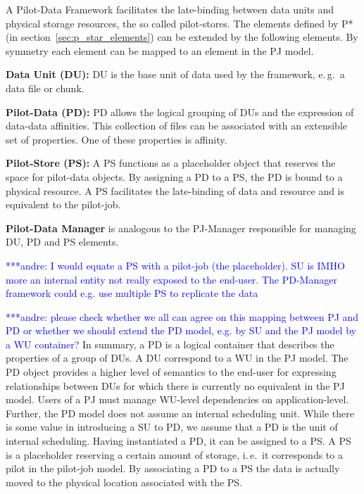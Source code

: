 \documentclass[conference,final]{IEEEtran}
\newcommand{\jhanote}[1]{ {\textcolor{red} { ***shantenu: #1 }}}
\newcommand{\alnote}[1]{ {\textcolor{blue} { ***andre: #1 }}}
\newcommand{\alnote}[1]{}
\newcommand{\jhanote}[1]{}
\begin{document}
A Pilot-Data Framework facilitates the late-binding between data units and
physical storage resources, the so called pilot-stores. The elements defined by
P* (in section~\ref{sec:p_star_elements}) can be extended by the following
elements. By symmetry each element can be mapped to an element in the PJ model.
\begin{compactenum}[A.]
\item \textbf{Data Unit (DU):} DU is the base unit of data used by the framework,
  e.\,g.\ a data file or chunk. 
\item \textbf{Pilot-Data (PD):} PD allows the logical grouping of DUs
  and the expression of data-data affinities. This collection of files
  can be associated with an extensible set of properties. One of these
  properties is affinity. 
\item \textbf{Pilot-Store (PS):} A PS functions as a
	  placeholder object that reserves the space for pilot-data objects. 
	  By assigning a PD to a PS, the PD is bound to a physical resource.
	  A PS facilitates the late-binding of data and resource and is equivalent 
	  to the pilot-job.
\item \textbf{Pilot-Data Manager} is analogous to the PJ-Manager responsible for 
  managing DU, PD and PS elements. 
\end{compactenum}

\alnote{I would equate a PS with a pilot-job (the placeholder). SU is
  IMHO more an internal entity not really exposed to the end-user. The
  PD-Manager framework could e.g. use multiple PS to replicate the
  data}

\alnote{please check whether we all can agree on this mapping between PJ and PD or whether we should extend the PD model, e.g. by SU and the PJ model by a WU container?}
In summary, a PD is a logical container that describes the properties of a group
of DUs. A DU correspond to a WU in the PJ model. The PD object provides a higher
level of semantics to the end-user for expressing relationships between DUs for
which there is currently no equivalent in the PJ model. Users of a PJ must
manage WU-level dependencies on application-level. Further, the PD model does
not assume an internal scheduling unit. While there is some value in introducing
a SU to PD, we assume that a PD is the unit of internal scheduling. Having
instantiated a PD, it can be assigned to a PS. A PS is a placeholder reserving a
certain amount of storage, i.\,e.\ it corresponds to a pilot in the pilot-job
model. By associating a PD to a PS the data is actually moved to the physical
location associated with the PS.
\end{document}
